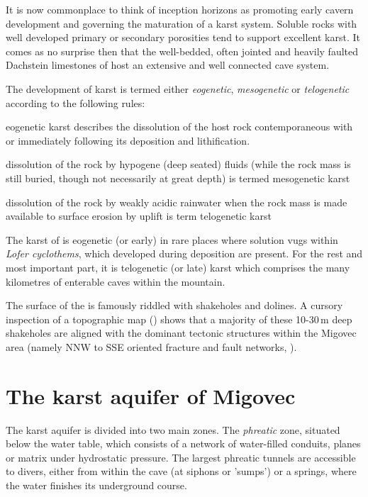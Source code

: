 It is now commonplace to think of inception horizons \citep{lowe1997carbonate} as promoting early cavern development and governing the maturation of a karst system. Soluble rocks with well developed primary or secondary porosities tend to support excellent karst. It comes as no surprise then that the well-bedded, often jointed and heavily faulted Dachstein limestones of  host an extensive and well connected cave system.

The development of karst is termed either \emph{eogenetic}, \emph{mesogenetic} or \emph{telogenetic} according to the following rules:
\begin{citemize}
\item eogenetic karst describes the dissolution of the host rock contemporaneous with or immediately following its deposition and lithification.
\item dissolution of the rock by hypogene (deep seated) fluids (while the rock mass is still buried, though not necessarily at great depth) is termed mesogenetic karst
\item dissolution of the rock by weakly acidic rainwater when the rock mass is made available to surface erosion by uplift is term telogenetic karst
\end{citemize}

The karst of  is eogenetic (or early) in rare places where solution vugs within \emph{Lofer cyclothems}, which developed during deposition  are present. For the rest and most important part, it is telogenetic (or late) karst which comprises the many kilometres of enterable caves within the mountain.

The surface of the  is famously riddled with shakeholes and dolines. A cursory inspection of a topographic map () shows that a majority of these 10-30\,m deep shakeholes are aligned with the dominant tectonic structures within the Migovec area (namely NNW to SSE oriented fracture and fault networks, ). 

\section{The karst aquifer of Migovec} 
The karst aquifer is divided into two main zones. The \emph{phreatic} zone, situated below the water table, which consists of a network of water-filled conduits, planes or matrix under hydrostatic pressure. The largest phreatic tunnels are accessible to divers, either from within the cave (at siphons or 'sumps') or a springs, where the water finishes its underground course. 

